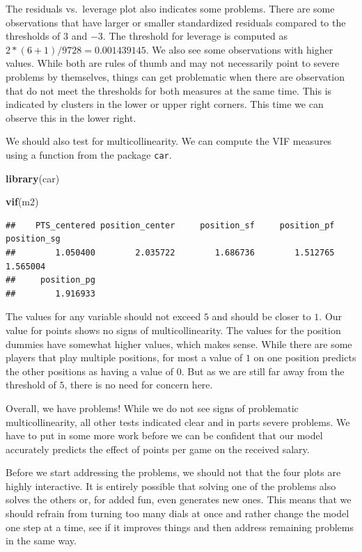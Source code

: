 \documentclass[
]{book}
\newenvironment{Shaded}{\begin{snugshade}}{\end{snugshade}}
\newcommand{\FunctionTok}[1]{\textcolor[rgb]{0.13,0.29,0.53}{\textbf{#1}}}
\newcommand{\NormalTok}[1]{#1}
\begin{document}
The residuals vs.~leverage plot also indicates some problems. There are some
observations that have larger or smaller standardized residuals compared to the
thresholds of \(3\) and \(-3\). The threshold for leverage is computed as
\(2 * (6 + 1) / 9728 = 0.001439145\). We also see some observations with higher
values. While both are rules of thumb and may not necessarily point to severe
problems by themselves, things can get problematic when there are observation
that do not meet the thresholds for both measures at the same time. This is
indicated by clusters in the lower or upper right corners. This time we can
observe this in the lower right.

We should also test for multicollinearity. We can compute the VIF measures using
a function from the package \texttt{car}.

\begin{Shaded}
\begin{Highlighting}[]
\FunctionTok{library}\NormalTok{(car)}

\FunctionTok{vif}\NormalTok{(m2)}
\end{Highlighting}
\end{Shaded}

\begin{verbatim}
##    PTS_centered position_center     position_sf     position_pf     position_sg 
##        1.050400        2.035722        1.686736        1.512765        1.565004 
##     position_pg 
##        1.916933
\end{verbatim}

The values for any variable should not exceed \(5\) and should be closer to \(1\).
Our value for points shows no signs of multicollinearity. The values for the
position dummies have somewhat higher values, which makes sense. While there are
some players that play multiple positions, for most a value of \(1\) on one
position predicts the other positions as having a value of \(0\). But as we are
still far away from the threshold of \(5\), there is no need for concern here.

Overall, we have problems! While we do not see signs of problematic
multicollinearity, all other tests indicated clear and in parts severe problems.
We have to put in some more work before we can be confident that our model
accurately predicts the effect of points per game on the received salary.

Before we start addressing the problems, we should not that the four plots are
highly interactive. It is entirely possible that solving one of the problems
also solves the others or, for added fun, even generates new ones. This means
that we should refrain from turning too many dials at once and rather change the
model one step at a time, see if it improves things and then address remaining
problems in the same way.
\end{document}
